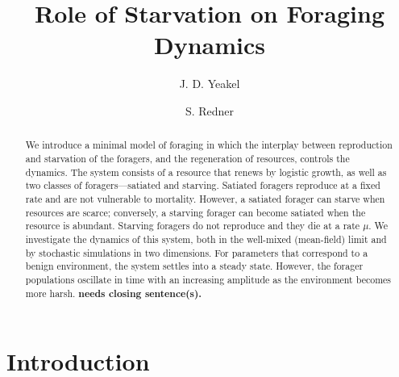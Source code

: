 \documentclass[11pt]{iopart}
\begin{document}
\title{Role of Starvation on Foraging Dynamics}


\author{J. D. Yeakel} \address{Santa Fe Institute, 1399 Hyde Park Road, Santa Fe, New
  Mexico 87501, USA}

\author{S. Redner} \address{Santa Fe Institute, 1399 Hyde Park Road, Santa Fe, New
  Mexico 87501, USA}

\begin{abstract}

  We introduce a minimal model of foraging in which the interplay between
  reproduction and starvation of the foragers, and the regeneration of
  resources, controls the dynamics.  The system consists of a resource that
  renews by logistic growth, as well as two classes of foragers---satiated
  and starving.  Satiated foragers reproduce at a fixed rate and are not
  vulnerable to mortality.  However, a satiated forager can starve when
  resources are scarce; conversely, a starving forager can become satiated
  when the resource is abundant.  Starving foragers do not reproduce and they
  die at a rate $\mu$.  We investigate the dynamics of this system, both in
  the well-mixed (mean-field) limit and by stochastic simulations in two
  dimensions.  For parameters that correspond to a benign environment, the
  system settles into a steady state.  However, the forager populations
  oscillate in time with an increasing amplitude as the environment becomes
  more harsh.  {\bf needs closing sentence(s).}

\end{abstract}

\section{Introduction}
\end{document}
